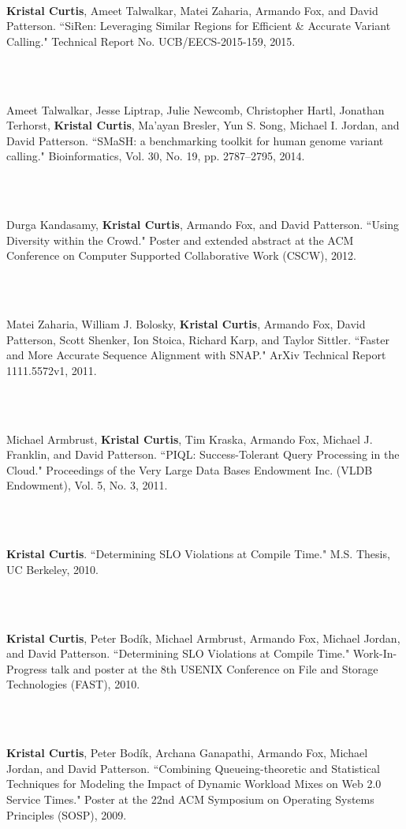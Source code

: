 \documentclass[11pt]{article}
\newcommand{\pagewidth}{6.8 in}
\newcommand{\tabwidth}{1.5 in}
\begin{document}
\begin{tabbing}
\hspace{\tabwidth} \= \\ 

\parbox[t]{\pagewidth}{\textbf{Kristal Curtis}, Ameet Talwalkar, Matei Zaharia, Armando Fox, and David Patterson.  ``SiRen:  Leveraging Similar Regions for Efficient \& Accurate Variant Calling."  Technical Report No. UCB/EECS-2015-159, 2015.}\\ \\
\parbox[t]{\pagewidth}{Ameet Talwalkar, Jesse Liptrap, Julie Newcomb, Christopher Hartl, Jonathan Terhorst, \textbf{Kristal Curtis}, Ma'ayan Bresler, Yun S. Song, Michael I. Jordan, and David Patterson.  ``SMaSH:  a benchmarking toolkit for human genome variant calling."  Bioinformatics, Vol. 30, No. 19, pp. 2787--2795, 2014.}\\ \\
\parbox[t]{\pagewidth}{Durga Kandasamy, \textbf{Kristal Curtis}, Armando Fox, and David Patterson.  ``Using Diversity within the Crowd."  Poster and extended abstract at the ACM Conference on Computer Supported Collaborative Work (CSCW), 2012.}\\ \\
\parbox[t]{\pagewidth}{Matei Zaharia, William J. Bolosky, \textbf{Kristal Curtis}, Armando Fox, David Patterson, Scott Shenker, Ion Stoica, Richard Karp, and Taylor Sittler.  ``Faster and More Accurate Sequence Alignment with SNAP."  ArXiv Technical Report 1111.5572v1, 2011.}\\ \\
\parbox[t]{\pagewidth}{Michael Armbrust, \textbf{Kristal Curtis}, Tim Kraska, Armando Fox, Michael J. Franklin, and David Patterson.  ``PIQL:  Success-Tolerant Query Processing in the Cloud."  Proceedings of the Very Large Data Bases Endowment Inc. (VLDB Endowment), Vol. 5, No. 3, 2011.}\\ \\
\parbox[t]{\pagewidth}{\textbf{Kristal Curtis}.  ``Determining SLO Violations at Compile Time."  M.S. Thesis, UC Berkeley, 2010.}\\ \\
\parbox[t]{\pagewidth}{\textbf{Kristal Curtis}, Peter Bod\'{i}k, Michael Armbrust, Armando Fox, Michael Jordan, and David Patterson.  ``Determining SLO Violations at Compile Time."  Work-In-Progress talk and poster at the 8th USENIX Conference on File and Storage Technologies (FAST), 2010.}\\ \\
\parbox[t]{\pagewidth}{\textbf{Kristal Curtis}, Peter Bod\'{i}k, Archana Ganapathi, Armando Fox, Michael Jordan, and David Patterson.  ``Combining Queueing-theoretic and Statistical Techniques for Modeling the Impact of Dynamic Workload Mixes on Web 2.0 Service Times."  Poster at the 22nd ACM Symposium on Operating Systems Principles (SOSP), 2009.}\\
\end{tabbing}
\end{document}
